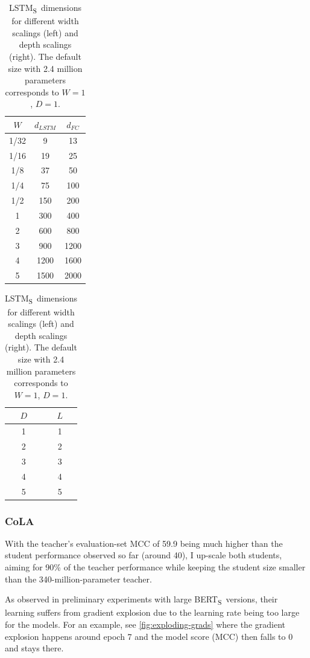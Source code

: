 \documentclass[bsc,frontabs,twoside,singlespacing,parskip,deptreport]{infthesis}
\def\BERTS{BERT\textsubscript{S}}
\def\LSTMS{LSTM\textsubscript{S}}
\begin{document}
{{{      \begin{table}[h!t]
      \centering
      \begin{tabular}{c|cc}
      \hline
      $W$ & $d_{LSTM}$  & $d_{FC}$\\ 
      \hline
      1/32& 9           & 13 \\
      1/16& 19          & 25 \\
      1/8 & 37          & 50 \\
      1/4 & 75          & 100 \\
      1/2 & 150         & 200 \\
      1   & 300         & 400 \\
      2   & 600         & 800 \\
      3   & 900         & 1200 \\
      4   & 1200        & 1600 \\
      5   & 1500        & 2000 \\
      \hline
      \end{tabular}
      \quad \quad \quad \quad
      \begin{tabular}{c|c}
      \hline
      $D$ & $L$ \\
      \hline
      1   & 1  \\
      2   & 2  \\
      3   & 3  \\
      4   & 4  \\
      5   & 5  \\
      \hline
      \end{tabular}
      \caption{\LSTMS~dimensions for different width scalings (left) and depth scalings (right). The default size with 2.4 million parameters corresponds to $W=1$, $D=1$.}
      \label{tab:sizes-lstm}
      \end{table}

      \subsubsection{CoLA}{
        With the teacher's evaluation-set MCC of 59.9 being much higher than the student performance observed so far (around 40), I up-scale both students, aiming for 90\% of the teacher performance while keeping the student size smaller than the 340-million-parameter teacher.

        As observed in preliminary experiments with large \BERTS~versions, their learning suffers from gradient explosion due to the learning rate being too large for the models. For an example, see \autoref{fig:exploding-grads} where the gradient explosion happens around epoch 7 and the model score (MCC) then falls to 0 and stays there.

}}}}
\end{document}
